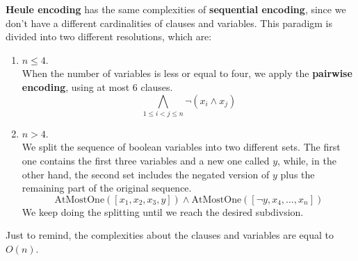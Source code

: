 \textbf{Heule encoding} has the same complexities of \textbf{sequential encoding}, since we don't have a different cardinalities of clauses and variables.
This paradigm is divided into two different resolutions, which are:
\begin{enumerate}
    \item $n \leq 4$. \\
    When the number of variables is less or equal to four, we apply the \textbf{pairwise encoding}, using at most $6$ clauses.
    $$\bigwedge_{1 \leq i < j \leq n} \neg (x_i \wedge x_j)$$
    \item $n > 4$. \\
    We split the sequence of boolean variables into two different sets. The first one contains the first three variables and a new one called $y$, while, in the 
    other hand, the second set includes the negated version of $y$ plus the remaining part of the original sequence.
    $$\text{AtMostOne}([x_1, x_2, x_3, y]) \wedge \text{AtMostOne}([\neg y, x_4, \dots, x_n])$$
    We keep doing the splitting until we reach the desired subdivsion.
\end{enumerate}
Just to remind, the complexities about the clauses and variables are equal to $O(n)$.